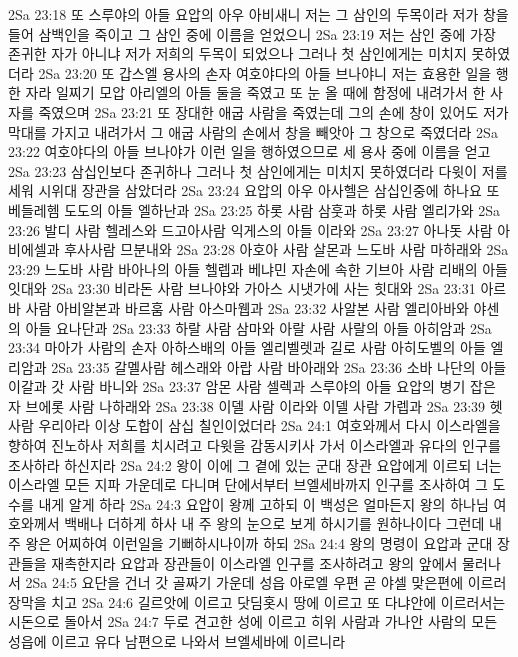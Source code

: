2Sa 23:18  또 스루야의 아들 요압의 아우 아비새니 저는 그 삼인의 두목이라 저가 창을 들어 삼백인을 죽이고 그 삼인 중에 이름을 얻었으니
2Sa 23:19  저는 삼인 중에 가장 존귀한 자가 아니냐 저가 저희의 두목이 되었으나 그러나 첫 삼인에게는 미치지 못하였더라
2Sa 23:20  또 갑스엘 용사의 손자 여호야다의 아들 브나야니 저는 효용한 일을 행한 자라 일찌기 모압 아리엘의 아들 둘을 죽였고 또 눈 올 때에 함정에 내려가서 한 사자를 죽였으며
2Sa 23:21  또 장대한 애굽 사람을 죽였는데 그의 손에 창이 있어도 저가 막대를 가지고 내려가서 그 애굽 사람의 손에서 창을 빼앗아 그 창으로 죽였더라
2Sa 23:22  여호야다의 아들 브나야가 이런 일을 행하였으므로 세 용사 중에 이름을 얻고
2Sa 23:23  삼십인보다 존귀하나 그러나 첫 삼인에게는 미치지 못하였더라 다윗이 저를 세워 시위대 장관을 삼았더라
2Sa 23:24  요압의 아우 아사헬은 삼십인중에 하나요 또 베들레헴 도도의 아들 엘하난과
2Sa 23:25  하롯 사람 삼훗과 하롯 사람 엘리가와
2Sa 23:26  발디 사람 헬레스와 드고아사람 익게스의 아들 이라와
2Sa 23:27  아나돗 사람 아비에셀과 후사사람 므분내와
2Sa 23:28  아호아 사람 살몬과 느도바 사람 마하래와
2Sa 23:29  느도바 사람 바아나의 아들 헬렙과 베냐민 자손에 속한 기브아 사람 리배의 아들 잇대와
2Sa 23:30  비라돈 사람 브나야와 가아스 시냇가에 사는 힛대와
2Sa 23:31  아르바 사람 아비알본과 바르훔 사람 아스마웹과
2Sa 23:32  사알본 사람 엘리아바와 야센의 아들 요나단과
2Sa 23:33  하랄 사람 삼마와 아랄 사람 사랄의 아들 아히암과
2Sa 23:34  마아가 사람의 손자 아하스배의 아들 엘리벨렛과 길로 사람 아히도벨의 아들 엘리암과
2Sa 23:35  갈멜사람 헤스래와 아랍 사람 바아래와
2Sa 23:36  소바 나단의 아들 이갈과 갓 사람 바니와
2Sa 23:37  암몬 사람 셀렉과 스루야의 아들 요압의 병기 잡은 자 브에롯 사람 나하래와
2Sa 23:38  이델 사람 이라와 이델 사람 가렙과
2Sa 23:39  헷 사람 우리아라 이상 도합이 삼십 칠인이었더라
2Sa 24:1  여호와께서 다시 이스라엘을 향하여 진노하사 저희를 치시려고 다윗을 감동시키사 가서 이스라엘과 유다의 인구를 조사하라 하신지라
2Sa 24:2  왕이 이에 그 곁에 있는 군대 장관 요압에게 이르되 너는 이스라엘 모든 지파 가운데로 다니며 단에서부터 브엘세바까지 인구를 조사하여 그 도수를 내게 알게 하라
2Sa 24:3  요압이 왕께 고하되 이 백성은 얼마든지 왕의 하나님 여호와께서 백배나 더하게 하사 내 주 왕의 눈으로 보게 하시기를 원하나이다 그런데 내 주 왕은 어찌하여 이런일을 기뻐하시나이까 하되
2Sa 24:4  왕의 명령이 요압과 군대 장관들을 재촉한지라 요압과 장관들이 이스라엘 인구를 조사하려고 왕의 앞에서 물러나서
2Sa 24:5  요단을 건너 갓 골짜기 가운데 성읍 아로엘 우편 곧 야셀 맞은편에 이르러 장막을 치고
2Sa 24:6  길르앗에 이르고 닷딤홋시 땅에 이르고 또 다냐안에 이르러서는 시돈으로 돌아서
2Sa 24:7  두로 견고한 성에 이르고 히위 사람과 가나안 사람의 모든 성읍에 이르고 유다 남편으로 나와서 브엘세바에 이르니라
